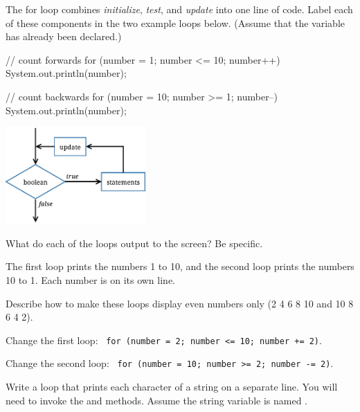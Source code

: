
The for loop combines \emph{initialize}, \emph{test}, and \emph{update} into one line of code.
Label each of these components in the two example loops below.
(Assume that the variable  has already been declared.)

\vspace{1ex}
\begin{minipage}{0.6\linewidth}
\begin{javalst}
    // count forwards
    for (number = 1; number <= 10; number++) {
        System.out.println(number);
    }

    // count backwards
    for (number = 10; number >= 1; number--) {
        System.out.println(number);
    }
\end{javalst}
\end{minipage}
\hfill
\begin{minipage}{0.38\linewidth}
\centering
\includegraphics[height=10em]{for.pdf}
\end{minipage}



\Q What do each of the  loops output to the screen? Be specific.

\begin{answer}
The first loop prints the numbers 1 to 10, and the second loop prints the numbers 10 to 1.
Each number is on its own line.
\end{answer}


\Q Describe how to make these loops display even numbers only (2 4 6 8 10 and 10 8 6 4 2).

\begin{answer}
Change the first loop: ~\texttt{for (number = 2; number <= 10; number += 2)}.

Change the second loop: ~\texttt{for (number = 10; number >= 2; number -= 2)}.
\end{answer}


\Q \label{forchar}
Write a  loop that prints each character of a string on a separate line.
You will need to invoke the  and  methods.
Assume the string variable is named .


